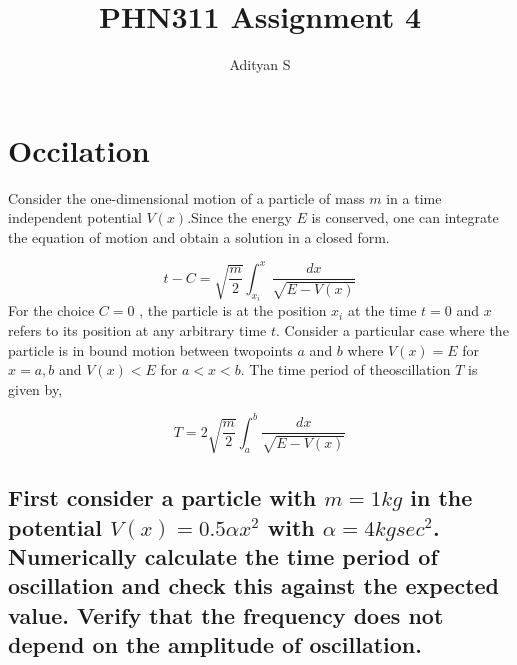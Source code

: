 \documentclass[a4paper,11pt,twoside]{article}
\author{Adityan S}
\date{}
\title{PHN311 Assignment 4}
\begin{document}
\maketitle
\tableofcontents

\clearpage

\section{Occilation}
\label{sec:org5462e46}
Consider the one-dimensional motion of a particle of mass \(m\) in a time independent potential \(V(x)\).Since the energy \(E\) is conserved, one can integrate the equation of motion and obtain a solution in a closed form.

\begin{equation}
t-C = \sqrt{\frac{m}{2}}\int_{x_i}^x \frac{dx}{\sqrt{E-V(x)}}
\end{equation}
For the choice \(C=0\) , the particle is at the position \(x_i\) at the time \(t = 0\) and \(x\) refers to its position at any arbitrary time \(t\). Consider a particular case where the particle is in bound motion between twopoints \(a\) and \(b\) where \(V(x) = E\) for \(x = a, b\) and \(V(x) < E\) for \(a < x < b\). The time period of theoscillation \(T\) is given by,

$$
T = 2 \sqrt{\frac{m}{2}}\int_{a}^b \frac{dx}{\sqrt{E-V(x)}}
$$

\begin{center}
\end{center}

\subsection{First consider a particle with \(m = 1 kg\) in the potential \(V(x) = 0.5 \alpha x^2\) with \(\alpha =4 kg sec^2\). Numerically calculate the time period of oscillation and check this against the expected value. Verify that the frequency does not depend on the amplitude of oscillation.}
\label{sec:orgbcd3b0d}
\end{document}
